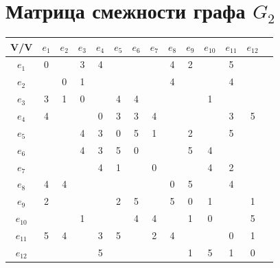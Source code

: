 \documentclass[12pt,a4paper]{report}
\begin{document}
\section*{Матрица смежности графа $G_2$}
\begin{tabular}{|c|c|c|c|c|c|c|c|c|c|c|c|c|c|}
    \hline
    V/V & $e_{1}$ & $e_{2}$ & $e_{3}$ & $e_{4}$ & $e_{5}$ & $e_{6}$ & $e_{7}$ & $e_{8}$ & $e_{9}$ & $e_{10}$ & $e_{11}$ & $e_{12}$ \\
    \hline
    $e_{1}$  & 0 &   & 3 & 4 &   &   &   & 4 & 2 &   & 5 &   \\
    \hline
    $e_{2}$  &   & 0 & 1 &   &   &   &   & 4 &   &   & 4 &   \\
    \hline
    $e_{3}$  & 3 & 1 & 0 &   & 4 & 4 &   &   &   & 1 &   &   \\
    \hline
    $e_{4}$  & 4 &   &   & 0 & 3 & 3 & 4 &   &   &   & 3 & 5 \\
    \hline
    $e_{5}$  &   &   & 4 & 3 & 0 & 5 & 1 &   & 2 &   & 5 &   \\
    \hline
    $e_{6}$  &   &   & 4 & 3 & 5 & 0 &   &   & 5 & 4 &   &   \\
    \hline
    $e_{7}$  &   &   &   & 4 & 1 &   & 0 &   &   & 4 & 2 &   \\
    \hline
    $e_{8}$  & 4 & 4 &   &   &   &   &   & 0 & 5 &   & 4 &   \\
    \hline
    $e_{9}$  & 2 &   &   &   & 2 & 5 &   & 5 & 0 & 1 &   & 1 \\
    \hline
    $e_{10}$ &   &   & 1 &   &   & 4 & 4 &   & 1 & 0 &   & 5 \\
    \hline
    $e_{11}$ & 5 & 4 &   & 3 & 5 &   & 2 & 4 &   &   & 0 & 1 \\
    \hline
    $e_{12}$ &   &   &   & 5 &   &   &   &   & 1 & 5 & 1 & 0 \\
    \hline
\end{tabular}
\end{document}
